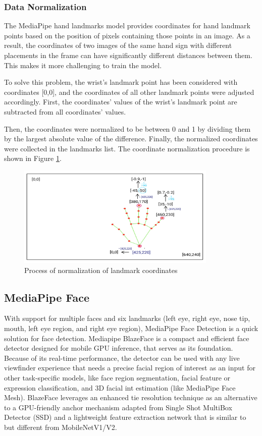 \subsubsection*{Data Normalization}\label{sec:norm}
The MediaPipe hand landmarks model provides coordinates for hand landmark points based on the position of pixels containing those points in an image. As a result, the coordinates of two images of the same hand sign with different placements in the frame can have significantly different distances between them. This makes it more challenging to train the model.

To solve this problem, the wrist's landmark point has been considered with coordinates [0,0], and the coordinates of all other landmark points were adjusted accordingly.
First, the coordinates' values of the wrist's landmark point are subtracted from all coordinates' values.

Then, the coordinates were normalized to be between 0 and 1 by dividing them by the largest absolute value of the difference. Finally, the normalized coordinates were collected in the landmarks list. The coordinate normalization procedure is shown in Figure \ref{fig:normalization}.


\begin{figure}
	\centering
	\includegraphics[width = 0.85\textwidth]{images/normalise.pdf}
	\caption{Process of normalization of landmark coordinates}
	\label{fig:normalization}
\end{figure}

\subsection*{MediaPipe Face}
With support for multiple faces and six landmarks (left eye, right eye, nose tip, mouth, left eye region, and right eye region), MediaPipe Face Detection is a quick solution for face detection. Mediapipe BlazeFace is a compact and efficient face detector designed for mobile GPU inference, that serves as its foundation. Because of its real-time performance, the detector can be used with any live viewfinder experience that needs a precise facial region of interest as an input for other task-specific models, like face region segmentation, facial feature or expression classification, and 3D facial int estimation (like MediaPipe Face Mesh). BlazeFace leverages an enhanced tie resolution technique as an alternative to a GPU-friendly anchor mechanism adapted from Single Shot MultiBox Detector (SSD) and a lightweight feature extraction network that is similar to but different from MobileNetV1/V2.


